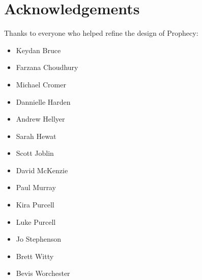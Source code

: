 \documentclass[12pt, a5paper, parskip=half-]{scrartcl}
\begin{document}
\newpage

\section*{Acknowledgements}
Thanks to everyone who helped refine the design of Prophecy:
\begin{itemize}
  \item Keydan Bruce
  \item Farzana Choudhury
  \item Michael Cromer
  \item Dannielle Harden
  \item Andrew Hellyer
  \item Sarah Hewat
  \item Scott Joblin
  \item David McKenzie
  \item Paul Murray
  \item Kira Purcell
  \item Luke Purcell
  \item Jo Stephenson
  \item Brett Witty
  \item Bevis Worchester
\end{itemize}
\end{document}
